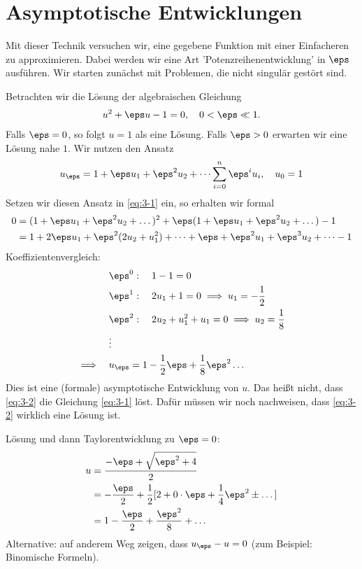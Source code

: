 
\section{Asymptotische Entwicklungen}
\label{sec:asympt-entw}
Mit dieser Technik versuchen wir, eine gegebene Funktion mit einer Einfacheren zu approximieren. Dabei werden wir eine Art 'Potenzreihenentwicklung' in $\eps$ ausführen. Wir starten zunächst mit Problemen, die nicht singulär gestört sind.
\begin{beispiel}\label{ex:3-1}
  Betrachten wir die Lösung der algebraischen Gleichung
  \begin{align}\label{eq:3-1}
    u^{2} + \eps u -1 = 0, \quad 0 <\eps \ll 1.
  \end{align}
Falls $\eps = 0$, so folgt $u = 1$ als eine Lösung. Falls $\eps > 0$ erwarten wir eine Lösung nahe $1$. Wir nutzen den Ansatz
\begin{align*}
  u_{\eps} = 1 + \eps u_{1} + \eps^{2} u_{2} + \dots  \sum_{i = 0}^{n} \eps^{i} u_{i}, \quad u_{0} = 1
\end{align*}
Setzen wir diesen Ansatz in \eqref{eq:3-1} ein, so erhalten wir formal
\begin{align*}
  0 &= (1 + \eps u_{1} + \eps^{2} u_{2} + \dots )^{2} + \eps (1 + \eps u_{1} + \eps^{2} u_{2} + \dots ) - 1\\
  &= 1 + 2 \eps u_{1} + \eps^{2} (2u_{2} + u_{1}^{2}) + \dots +  \eps + \eps^{2} u_{1} + \eps^{3} u_{2} + \dots - 1  
\end{align*}
Koeffizientenvergleich:
\begin{align}\label{eq:3-2}
  &\eps^{0}: \quad 1 -1 = 0\notag\\
  &\eps^{1}: \quad 2u_{1} + 1 = 0 \implies u_{1} = -\frac 1 2\notag\\
  &\eps^{2}: \quad 2u_{2} + u_{1}^{2} + u_{1} = 0 \implies u_{2} = \frac 1 8\notag\\
  & \vdots \notag\\
\implies \quad & u_{\eps} = 1 - \frac 12 \eps + \frac 1 8 \eps ^{2} \dots
\end{align}
Dies ist eine (formale) asymptotische Entwicklung von $u$. Das heißt nicht, dass \eqref{eq:3-2} die Gleichung \eqref{eq:3-1} löst. Dafür müssen wir noch nachweisen, dass \eqref{eq:3-2} wirklich eine Lösung ist. 

Lösung und dann Taylorentwicklung zu $\eps = 0$:
\begin{align*}
  u &= \frac {- \eps + \sqrt{\eps^{2} + 4}} 2\\
  &= - \frac \eps 2 + \frac 12 [2 + 0\cdot \eps + \frac 1 4 \eps^{2} \pm \dots] \\
  &= 1 - \frac \eps 2 + \frac {\eps^{2}} 8 +\dots
\end{align*}
Alternative: auf anderem Weg zeigen, dass $u_{\eps} - u = 0$ (zum Beispiel: Binomische Formeln).
\end{beispiel}
